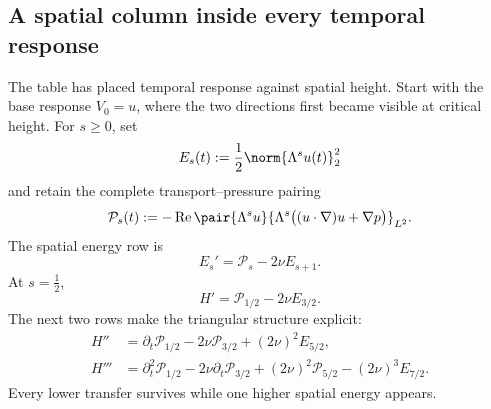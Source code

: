 \subsection{A spatial column inside every temporal response}\label{sub:TheViscosityDrivenSpatialAscent}

The table has placed temporal response against spatial height.  Start with the
base response \(V_0=u\), where the two directions first became visible at
critical height.  For \(s\geq0\), set
\[
  E_s(t):=\frac12\norm{\Lambda^su(t)}_2^2
\]
and retain the complete transport--pressure pairing
\[
  \mathcal P_s(t)
  :=-
  \operatorname{Re}
  \pair{\Lambda^su}
  {\Lambda^s\bigl((u\cdot\nabla)u+\nabla p\bigr)}_{L^2}.
\]
The spatial energy row is
\begin{equation}\label{eq:BodyFullSpatialEnergyBalance}
  E_s'=\mathcal P_s-2\nu E_{s+1}.
\end{equation}
At \(s=\tfrac12\),
\begin{equation}\label{eq:BodyFirstCriticalRow}
  H'=\mathcal P_{1/2}-2\nu E_{3/2}.
\end{equation}
The next two rows make the triangular structure explicit:
\begin{align}
  H''
  &=\partial_t\mathcal P_{1/2}
  -2\nu\mathcal P_{3/2}
  +(2\nu)^2E_{5/2},
  \label{eq:BodySecondCriticalRow}\\
  H'''
  &=\partial_t^2\mathcal P_{1/2}
  -2\nu\partial_t\mathcal P_{3/2}
  +(2\nu)^2\mathcal P_{5/2}
  -(2\nu)^3E_{7/2}.
  \label{eq:BodyThirdCriticalRow}
\end{align}
Every lower transfer survives while one higher spatial energy appears.

